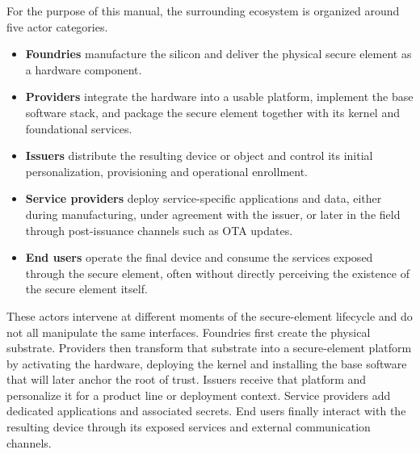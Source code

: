 For the purpose of this manual, the surrounding ecosystem is organized around
five actor categories.

\begin{itemize}
\item \textbf{Foundries} manufacture the silicon and deliver the physical secure
  element as a hardware component.
\item \textbf{Providers} integrate the hardware into a usable platform,
  implement the base software stack, and package the secure element together
  with its kernel and foundational services.
\item \textbf{Issuers} distribute the resulting device or object and control its
  initial personalization, provisioning and operational enrollment.
\item \textbf{Service providers} deploy service-specific applications and data,
  either during manufacturing, under agreement with the issuer, or later in the
  field through post-issuance channels such as OTA updates.
\item \textbf{End users} operate the final device and consume the services
  exposed through the secure element, often without directly perceiving the
  existence of the secure element itself.
\end{itemize}

These actors intervene at different moments of the secure-element lifecycle and
do not all manipulate the same interfaces. Foundries first create the physical
substrate. Providers then transform that substrate into a secure-element
platform by activating the hardware, deploying the kernel and installing the
base software that will later anchor the root of trust. Issuers receive that
platform and personalize it for a product line or deployment context. Service
providers add dedicated applications and associated secrets. End users finally
interact with the resulting device through its exposed services and external
communication channels.

